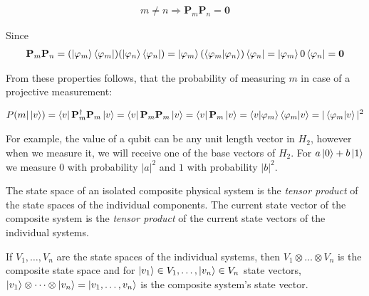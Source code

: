 \begin{property}

\begin{align*}
m \neq n \Rightarrow \mathbf{P}_m\mathbf{P}_n = \mathbf{0}
\end{align*}

Since
\begin{align*}
\mathbf{P}_m\mathbf{P}_n =
(\ket{\varphi_m}\bra{\varphi_m})(\ket{\varphi_n}\bra{\varphi_n}) =
\ket{\varphi_m}(\bra{\varphi_m}\ket{\varphi_n})\bra{\varphi_n} =
\ket{\varphi_m}0\bra{\varphi_n} =
\mathbf{0}
\end{align*}

\end{property}

From these properties follows, that the probability of measuring $m$ in case of a projective measurement:

\begin{align*}
P(m | \ket{v}) =
\bra{v}\mathbf{P}_m^{\dagger}\mathbf{P}_m \ket{v} =
\bra{v}\mathbf{P}_m\mathbf{P}_m\ket{v} = 
\bra{v}\mathbf{P}_m\ket{v} =
\bra{v}\ket{\varphi_m}\bra{\varphi_m}\ket{v} = |\bra{\varphi_m}\ket{v}|^2
\end{align*}

For example, the value of a qubit can be any unit length vector in $H_2$, however when we measure it, we will receive one
of the base vectors of $H_2$. For $a\ket{0} + b\ket{1}$ we measure $0$ with probability $|a|^2$ and $1$ with probability $|b|^2$.

\label{Postulate4}

The state space of an isolated composite physical system is the \textit{tensor product} of the state spaces of the individual components. The current state vector of the composite system is the \textit{tensor product} of the current state vectors of the individual systems.

If $V_1,\dots,V_n$ are the state spaces of the individual systems, then $V_1 \otimes \dots \otimes V_n$ is the composite state space and for $\ket{v_1} \in V_1, \dots, \ket{v_n} \in V_n$ state vectors, $\ket{v_1} \otimes \dots \otimes \ket{v_n} = \ket{v_1,\dots,v_n}$ is the composite system's state vector.


